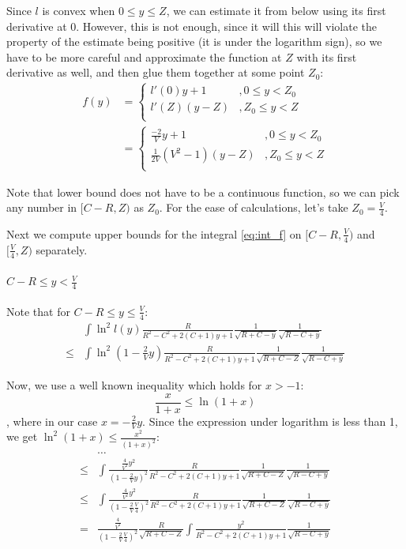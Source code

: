 \documentclass{gCOV2e}
\theoremstyle{plain}%
\theoremstyle{definition}
\theoremstyle{remark}
\begin{document}
Since $l$ is convex when $0 \le y \le Z$, we can estimate it from below using its first derivative at $0$. However, this is not enough, since it will this will violate the property of the estimate being positive (it is under the logarithm sign), so we have to be more careful and approximate the function at $Z$ with its first derivative as well, and then glue them together at some point $Z_0$:
\begin{align*}
f(y)
& = 
\begin{cases}
l'(0) y + 1   &, 0 \le y < Z_0  \\
l'(Z) (y - Z) &, Z_0 \le y < Z \\
\end{cases}
\\
& =
\begin{cases}
\frac{-2}{V} y + 1   &, 0 \le y < Z_0  \\
\frac{1}{2 V}(V^2 - 1) (y - Z) &, Z_0 \le y < Z \\
\end{cases}
\end{align*}

Note that lower bound does not have to be a continuous function, so we can pick any number in $[C - R, Z)$ as $Z_0$. For the ease of calculations, let's take $Z_0 = \frac{V}{4}$.

Next we compute upper bounds for the integral \ref{eq:int_f} on $[C - R, \frac{V}{4})$ and $[\frac{V}{4}, Z)$ separately.

\paragraph{$C - R \le y < \frac{V}{4}$}

Note that for $C - R \le y \le \frac{V}{4}$:
\begin{align*}
       & \int \ln^2 l(y) \frac{R}{R^2 - C^2 + 2 (C + 1) y + 1} \frac{1}{\sqrt{R + C - y}} \frac{1}{\sqrt{R - C + y}}
\\ \le & \int \ln^2 (1 - \frac{2}{V} y) \frac{R}{R^2 - C^2 + 2 (C + 1) y + 1} \frac{1}{\sqrt{R + C - Z}} \frac{1}{\sqrt{R - C + y}}
\end{align*}

Now, we use a well known inequality which holds for $x > -1$: %
\[
\frac{x}{1 + x} \le \ln (1 + x)
\]
, where in our case $x = -\frac{2}{V} y$. Since the expression under logarithm is less than 1, we get $\ln^2 (1 + x) \le \frac{x^2}{(1 + x)^2}$:
\begin{align*}
       & \dots 
\\ \le & \int \frac{\frac{4}{V^2}y^2}{(1 - \frac{2}{V}y)^2}  \frac{R}{R^2 - C^2 + 2 (C + 1) y + 1} \frac{1}{\sqrt{R + C - Z}} \frac{1}{\sqrt{R - C + y}}
\\ \le & \int \frac{\frac{4}{V^2}y^2}{(1 - \frac{2}{V} \frac{V}{4})^2}  \frac{R}{R^2 - C^2 + 2 (C + 1) y + 1} \frac{1}{\sqrt{R + C - Z}} \frac{1}{\sqrt{R - C + y}}
\\ =   & \frac{\frac{4}{V^2}}{(1 - \frac{2}{V} \frac{V}{4})^2} \frac{R}{\sqrt{R + C - Z}}  \int \frac{y^2}{R^2 - C^2 + 2 (C + 1) y + 1}  \frac{1}{\sqrt{R - C + y}}
\end{align*}
\end{document}
